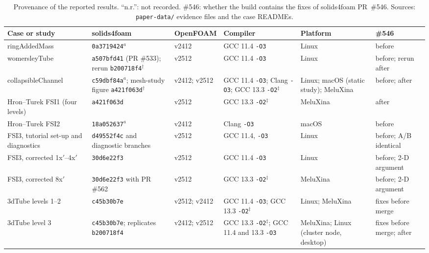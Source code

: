 \begin{table}[htbp]
	\centering
	\footnotesize
	\setlength{\tabcolsep}{3pt}
	\caption{Provenance of the reported results. ``n.r.'': not recorded. \#546: whether the build contains the fixes of solids4foam PR~\#546. Sources: \texttt{paper-data/} evidence files and the case READMEs.}
	\label{tab:provenance}
	\begin{tabular}{p{2.9cm}p{2.5cm}p{1.5cm}p{2.4cm}p{1.8cm}p{2.1cm}}
		\toprule
		Case or study & solids4foam & OpenFOAM & Compiler & Platform & \#546 \\
		\midrule
		ringAddedMass & \texttt{0a3719424}$^a$ & v2412 & GCC 11.4 \texttt{-O3} & Linux & before \\
		womersleyTube & \texttt{a507bfd41} (PR \#533); rerun \texttt{b200718f4}$^\dagger$ & v2512 & GCC 11.4 \texttt{-O3} & Linux & before; rerun after \\
		collapsibleChannel & \texttt{c59dbf84a}$^a$; mesh-study figure \texttt{a421f063d}$^\dagger$ & v2412; v2512 & GCC 11.4 \texttt{-O3}; Clang \texttt{-O3}; GCC 13.3 \texttt{-O2}$^\ddagger$ & Linux; macOS (static study); MeluXina & before; after \\
		Hron--Turek FSI1 (four levels) & \texttt{a421f063d} & v2512 & GCC 13.3 \texttt{-O2}$^\ddagger$ & MeluXina & after \\
		Hron--Turek FSI2 & \texttt{18a052637}$^a$ & v2412 & Clang \texttt{-O3} & macOS & before \\
		FSI3, tutorial set-up and diagnostics & \texttt{d49552f4c} and diagnostic branches & v2512 & GCC 11.4, \texttt{-O3} & Linux & before; A/B identical \\
		FSI3, corrected 1x$'$--4x$'$ & \texttt{30d6e22f3} & v2512 & GCC 11.4 \texttt{-O3} & Linux & before; 2-D argument \\
		FSI3, corrected 8x$'$ & \texttt{30d6e22f3} with PR \#562 & v2512 & GCC 13.3 \texttt{-O2}$^\ddagger$ & MeluXina & before; 2-D argument \\
		3dTube levels 1--2 & \texttt{c45b30b7e} & v2512; v2412 & GCC 11.4 \texttt{-O3}; GCC 13.3 \texttt{-O2}$^\ddagger$ & Linux; MeluXina & fixes before merge \\
		3dTube level 3 & \texttt{c45b30b7e}; replicates \texttt{b200718f4} & v2412; v2512 & GCC 13.3 \texttt{-O2}$^\ddagger$; GCC 11.4 and 13.3 \texttt{-O3} & MeluXina; Linux (cluster node, desktop) & fixes before merge; after \\

\end{tabular}
\end{table}
